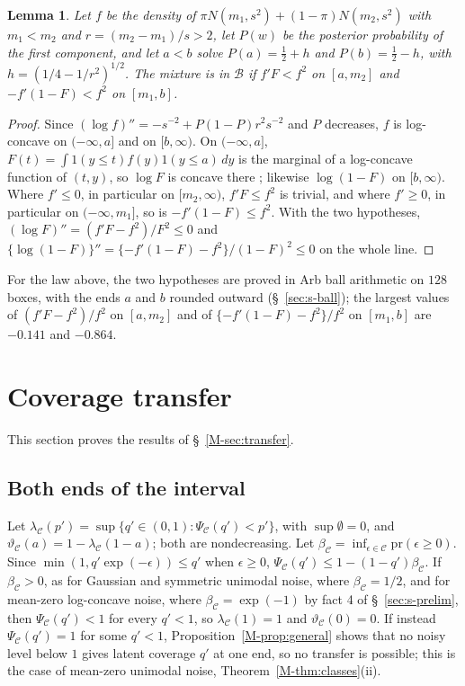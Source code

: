 \documentclass[12pt]{article}
\renewcommand{\_}{\usc\allowbreak}
\newtheorem{lemma}{Lemma}
\theoremstyle{definition}
\numberwithin{equation}{section}
\newcommand{\pr}{\mathrm{pr}}
\newcommand{\B}{\mathcal{B}}
\newcommand{\E}{\mathcal{C}}
\begin{document}
\begin{lemma}\label{lem:bimodal}
Let $f$ be the density of $\pi N(m_1, s^2) + (1 - \pi)N(m_2, s^2)$ with $m_1 < m_2$ and $r = (m_2 - m_1)/s > 2$, let $P(w)$ be the posterior probability of the first component, and let $a < b$ solve $P(a) = \tfrac12 + h$ and $P(b) = \tfrac12 - h$, with $h = (1/4 - 1/r^2)^{1/2}$. The mixture is in $\B$ if $f'F < f^2$ on $[a, m_2]$ and $-f'(1 - F) < f^2$ on $[m_1, b]$.
\end{lemma}

\begin{proof}
Since $(\log f)'' = -s^{-2} + P(1 - P)r^2s^{-2}$ and $P$ decreases, $f$ is log-concave on $(-\infty, a]$ and on $[b, \infty)$. On $(-\infty, a]$, $F(t) = \int 1(y \le t)f(y)1(y \le a)\,dy$ is the marginal of a log-concave function of $(t, y)$, so $\log F$ is concave there \citep{prekopa1973}; likewise $\log(1 - F)$ on $[b, \infty)$. Where $f' \le 0$, in particular on $[m_2, \infty)$, $f'F \le f^2$ is trivial, and where $f' \ge 0$, in particular on $(-\infty, m_1]$, so is $-f'(1 - F) \le f^2$. With the two hypotheses, $(\log F)'' = (f'F - f^2)/F^2 \le 0$ and $\{\log(1 - F)\}'' = \{-f'(1 - F) - f^2\}/(1 - F)^2 \le 0$ on the whole line.
\end{proof}

For the law above, the two hypotheses are proved in Arb ball arithmetic on $128$ boxes, with the ends $a$ and $b$ rounded outward (\S~\ref{sec:s-ball}); the largest values of $(f'F - f^2)/f^2$ on $[a, m_2]$ and of $\{-f'(1 - F) - f^2\}/f^2$ on $[m_1, b]$ are $-0.141$ and $-0.864$.

\section{Coverage transfer}\label{sec:s-transfer}

This section proves the results of \S~\ref{M-sec:transfer}.

\subsection{Both ends of the interval}\label{sec:s-twoend}

Let $\lambda_{\E}(p') = \sup\{q' \in (0, 1) : \Psi_{\E}(q') < p'\}$, with $\sup\emptyset = 0$, and $\vartheta_{\E}(a) = 1 - \lambda_{\E}(1 - a)$; both are nondecreasing. Let $\beta_{\E} = \inf_{\epsilon \in \E}\pr(\epsilon \ge 0)$. Since $\min(1, q'\exp(-\epsilon)) \le q'$ when $\epsilon \ge 0$, $\Psi_{\E}(q') \le 1 - (1 - q')\beta_{\E}$. If $\beta_{\E} > 0$, as for Gaussian and symmetric unimodal noise, where $\beta_{\E} = 1/2$, and for mean-zero log-concave noise, where $\beta_{\E} = \exp(-1)$ by fact 4 of \S~\ref{sec:s-prelim}, then $\Psi_{\E}(q') < 1$ for every $q' < 1$, so $\lambda_{\E}(1) = 1$ and $\vartheta_{\E}(0) = 0$. If instead $\Psi_{\E}(q') = 1$ for some $q' < 1$, Proposition~\ref{M-prop:general} shows that no noisy level below $1$ gives latent coverage $q'$ at one end, so no transfer is possible; this is the case of mean-zero unimodal noise, Theorem~\ref{M-thm:classes}(ii).
\end{document}
